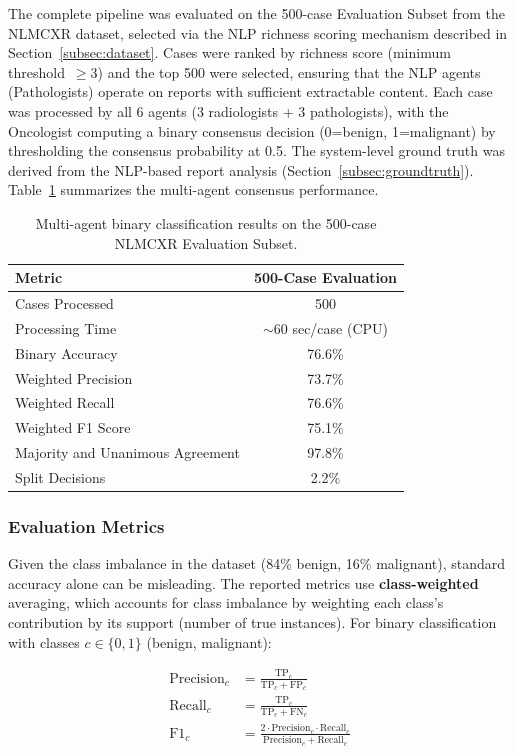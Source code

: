 \documentclass[12pt]{article}
\begin{document}
The complete pipeline was evaluated on the 500-case Evaluation Subset from the NLMCXR dataset, selected via the NLP richness scoring mechanism described in Section~\ref{subsec:dataset}. Cases were ranked by richness score (minimum threshold~$\geq 3$) and the top 500 were selected, ensuring that the NLP agents (Pathologists) operate on reports with sufficient extractable content. Each case was processed by all 6 agents (3 radiologists + 3 pathologists), with the Oncologist computing a binary consensus decision (0=benign, 1=malignant) by thresholding the consensus probability at 0.5. The system-level ground truth was derived from the NLP-based report analysis (Section~\ref{subsec:groundtruth}). Table~\ref{tab:results} summarizes the multi-agent consensus performance.

\begin{table}[ht]
\centering
\begin{tabular}{lc}
\toprule
\textbf{Metric} & \textbf{500-Case Evaluation} \\
\midrule
Cases Processed & 500 \\
Processing Time & $\sim$60 sec/case (CPU) \\
\midrule
Binary Accuracy & 76.6\% \\
Weighted Precision & 73.7\% \\
Weighted Recall & 76.6\% \\
Weighted F1 Score & 75.1\% \\
\midrule
Majority and Unanimous Agreement & 97.8\% \\
Split Decisions & 2.2\% \\
\bottomrule
\end{tabular}
\caption{Multi-agent binary classification results on the 500-case NLMCXR Evaluation Subset.}
\label{tab:results}
\end{table}

\subsubsection{Evaluation Metrics}

Given the class imbalance in the dataset (84\% benign, 16\% malignant), standard accuracy alone can be misleading. The reported metrics use \textbf{class-weighted} averaging, which accounts for class imbalance by weighting each class's contribution by its support (number of true instances). For binary classification with classes $c \in \{0, 1\}$ (benign, malignant):

\begin{align}
\text{Precision}_c &= \frac{\text{TP}_c}{\text{TP}_c + \text{FP}_c} \\
\text{Recall}_c &= \frac{\text{TP}_c}{\text{TP}_c + \text{FN}_c} \\
\text{F1}_c &= \frac{2 \cdot \text{Precision}_c \cdot \text{Recall}_c}{\text{Precision}_c + \text{Recall}_c}
\end{align}
\end{document}
